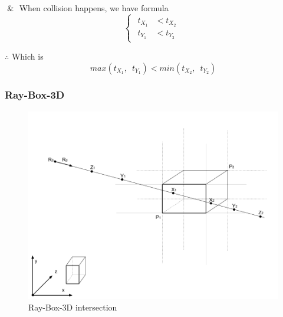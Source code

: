 $\And$ When collision happens,  we have formula
\[
\left\{
\begin{array}{lr}
\begin{aligned}
t_{X_1} &< t_{X_2} \\
t_{Y_1} &< t_{Y_2}
\end{aligned}
\end{array}
\right.
\]

$\therefore$ Which is
\begin{equation}\label{equ:ray-box-2d-intersection}
max(t_{X_1},\enspace t_{Y_1}) < min(t_{X_2},\enspace t_{Y_2})
\end{equation}

\subsubsection{Ray-Box-3D}

\begin{figure}[H]\label{fig:ray-box-3d}
\centering
\includegraphics[width=\linewidth]{Figures/ray-box-3d-intersection.png}
\decoRule
\caption[ray-box-3d-intersection]{Ray-Box-3D intersection}
\end{figure}

